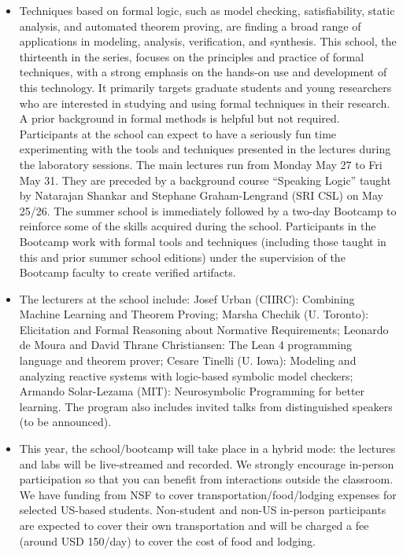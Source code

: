 \documentclass[prodmode,acmtecs]{acmsmall} %
\begin{document}
\begin{itemize}\item  Techniques based on formal logic, such as model checking, satisfiability, static analysis, and automated theorem proving, are finding a broad range of applications in modeling, analysis, verification, and synthesis. This school, the thirteenth in the series, focuses on the principles and practice of formal techniques, with a strong emphasis on the hands-on use and development of this technology. It primarily targets graduate students and young researchers who are interested in studying and using formal techniques in their research. A prior background in formal methods is helpful but not required. Participants at the school can expect to have a seriously fun time experimenting with the tools and techniques presented in the lectures during the laboratory sessions. The main lectures run from Monday May 27 to Fri May 31. They are preceded by a background course ``Speaking Logic'' taught by Natarajan Shankar and Stephane Graham-Lengrand (SRI CSL) on May 25/26. The summer school is immediately followed by a two-day Bootcamp to reinforce some of the skills acquired during the school. Participants in the Bootcamp work with formal tools and techniques (including those taught in this and prior summer school editions) under the supervision of the Bootcamp faculty to create verified artifacts. 
 
\item  The lecturers at the school include: Josef Urban (CIIRC): Combining Machine Learning and Theorem Proving; Marsha Chechik (U. Toronto): Elicitation and Formal Reasoning about Normative Requirements; Leonardo de Moura and David Thrane Christiansen: The Lean 4 programming language and theorem prover; Cesare Tinelli (U. Iowa): Modeling and analyzing reactive systems with logic-based symbolic model checkers; Armando Solar-Lezama (MIT): Neurosymbolic Programming for better learning. The program also includes invited talks from distinguished speakers (to be announced). 
 
\item  This year, the school/bootcamp will take place in a hybrid mode: the lectures and labs will be live-streamed and recorded. We strongly encourage in-person participation so that you can benefit from interactions outside the classroom. We have funding from NSF to cover transportation/food/lodging expenses for selected US-based students. Non-student and non-US in-person participants are expected to cover their own transportation and will be charged a fee (around USD 150/day) to cover the cost of food and lodging. 
 

\end{itemize}
\end{document}

